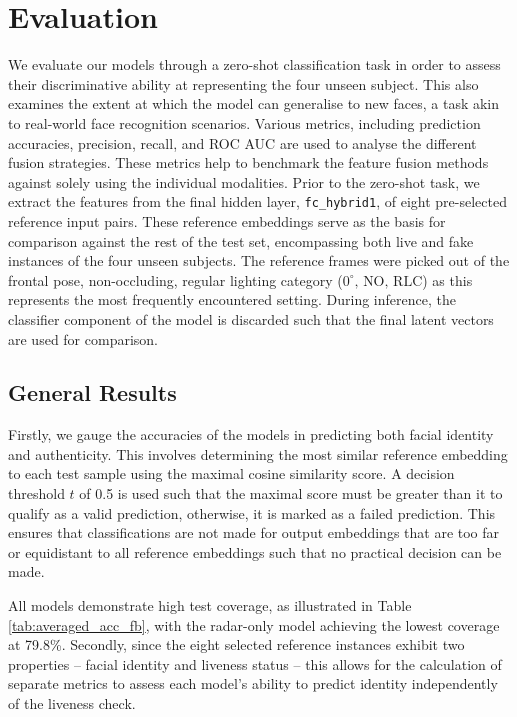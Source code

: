 \documentclass{mpaper}
\begin{document}
\section{Evaluation}
We evaluate our models through a zero-shot classification task in order to assess their discriminative ability at representing the four unseen subject. This also examines the extent at which the model can generalise to new faces, a task akin to real-world face recognition scenarios. Various metrics, including prediction accuracies, precision, recall, and ROC AUC are used to analyse the different fusion strategies. These metrics help to benchmark the feature fusion methods against solely using the individual modalities. Prior to the zero-shot task, we extract the features from the final hidden layer, \verb|fc_hybrid1|, of eight pre-selected reference input pairs. These reference embeddings serve as the basis for comparison against the rest of the test set, encompassing both live and fake instances of the four unseen subjects. The reference frames were picked out of the frontal pose, non-occluding, regular lighting category ($0^\circ, \, \text{NO}, \, \text{RLC}$) as this represents the most frequently encountered setting. During inference, the classifier component of the model is discarded such that the final latent vectors are used for comparison. 


\subsection{General Results}
Firstly, we gauge the accuracies of the models in predicting both facial identity and authenticity. This involves determining the most similar reference embedding to each test sample using the maximal cosine similarity score. A decision threshold $t$ of 0.5 is used such that the maximal score must be greater than it to qualify as a valid prediction, otherwise, it is marked as a failed prediction. This ensures that classifications are not made for output embeddings that are too far or equidistant to all reference embeddings such that no practical decision can be made. 

All models demonstrate high test coverage, as illustrated in Table \ref{tab:averaged_acc_fb}, with the radar-only model achieving the lowest coverage at 79.8\%. Secondly, since the eight selected reference instances exhibit two properties -- facial identity and liveness status -- this allows for the calculation of separate metrics to assess each model's ability to predict identity independently of the liveness check.
\end{document}
